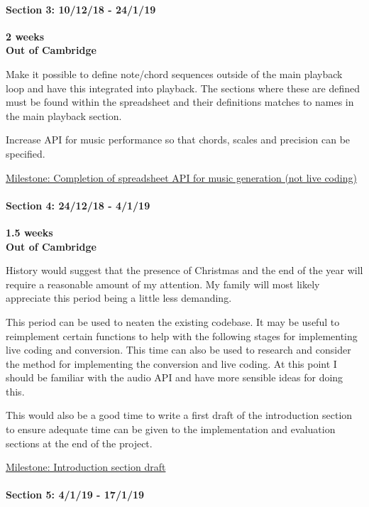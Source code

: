 \documentclass[]{article}
\let\oldparagraph\paragraph
\renewcommand{\paragraph}[1]{\oldparagraph{#1}\mbox{}}
\begin{document}
\paragraph{Section 3: 10/12/18 - 24/1/19}\label{header-n90}

\textbf{2 weeks}\\\textbf{Out of Cambridge}

Make it possible to define note/chord sequences outside of the main
playback loop and have this integrated into playback. The sections where
these are defined must be found within the spreadsheet and their
definitions matches to names in the main playback section.

Increase API for music performance so that chords, scales and precision
can be specified.

\underline{Milestone: Completion of spreadsheet API for music generation
(not live coding)}

\paragraph{Section 4: 24/12/18 - 4/1/19}\label{header-n95}

\textbf{1.5 weeks}\\\textbf{Out of Cambridge}

History would suggest that the presence of Christmas and the end of the
year will require a reasonable amount of my attention. My family will
most likely appreciate this period being a little less demanding.

This period can be used to neaten the existing codebase. It may be
useful to reimplement certain functions to help with the following
stages for implementing live coding and conversion. This time can also
be used to research and consider the method for implementing the
conversion and live coding. At this point I should be familiar with the
audio API and have more sensible ideas for doing this.

This would also be a good time to write a first draft of the
introduction section to ensure adequate time can be given to the
implementation and evaluation sections at the end of the project.

\underline{Milestone: Introduction section draft}

\paragraph{Section 5: 4/1/19 - 17/1/19}\label{header-n101}
\end{document}
